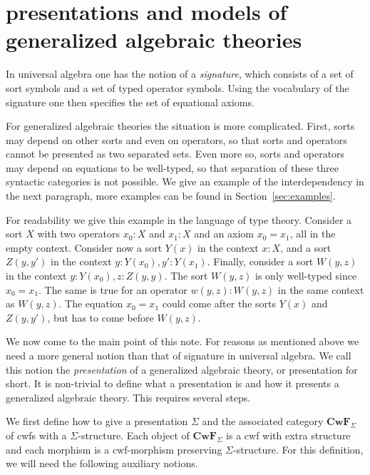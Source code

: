 \documentclass{lmcs}
\newcommand{\FYI}[1]{{\color{red}#1}}
\def\Cwf{\mathbf{CwF}}
\begin{document}
\section{\FYI{presentations} and models of generalized algebraic theories}\label{gat-sig-mod}

In universal algebra one has the notion of a \emph{signature},
which consists of a set of sort symbols and a set of typed operator symbols.
Using the vocabulary of the signature one then specifies the set
of equational axioms. 

For generalized algebraic theories the situation is more complicated.
First, sorts may depend on other sorts and even on operators,
so that sorts and operators cannot be presented as two separated sets.
Even more so, sorts and operators may depend on equations to
be well-typed, so that separation of these three syntactic
categories is not possible. We give an example of the interdependency 
in the next paragraph, more examples can be found in Section~\ref{sec:examples}.

For readability we give this example in the language of type theory.
Consider a sort $X$ with two operators $x_0 :X$ and $x_1 : X$
and an axiom $x_0 = x_1$, all in the empty context. Consider now a sort
$Y(x)$ in the context $x:X$, and a sort $Z(y,y')$ in the context
$y:Y(x_0), y':Y(x_1)$. Finally, consider a sort $W(y,z)$ in the
context $y:Y(x_0), z:Z(y,y)$. The sort $W(y,z)$ is only well-typed
since $x_0 = x_1$. The same is true for an operator $w(y,z): W(y,z)$
in the same context as $W(y,z)$. The equation $x_0 = x_1$ could come
after the sorts $Y(x)$ and $Z(y,y')$, but has to come before $W(y,z)$.

We now come to the main point of this note.
For reasons as mentioned above we need a more general notion
than that of signature in universal algebra.  
We call this notion the \emph{presentation} of a generalized algebraic theory,
or presentation for short. It is non-trivial to define what a presentation
is and how it presents a generalized algebraic theory.
This requires several steps.

We first define how to \FYI{give a presentation} $\Sigma$ and the associated category $\Cwf_{\Sigma}$ of cwfs with a $\Sigma$-structure.
Each object of $\Cwf_{\Sigma}$ is a cwf with extra structure and
each morphism is a cwf-morphism preserving $\Sigma$-structure.
For this definition, we will need the following auxiliary notions.
\end{document}
